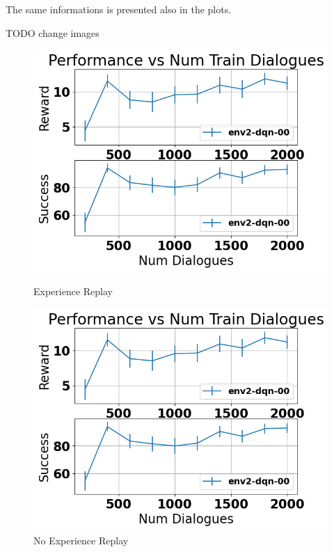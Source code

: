 \documentclass[12pt,titlepage,a4paper]{article}
\begin{document}
The same informations is presented also in the plots.

TODO change images
\begin{figure}[!htb]
      \includegraphics[width=\linewidth]{env2-CamRestaurants-experience.png}
      \caption{Experience Replay}
    \endminipage\hfill
      \includegraphics[width=\linewidth]{env2-CamRestaurants-experience.png}
      \caption{No Experience Replay}
    \endminipage\hfill

\end{figure}
\end{document}
